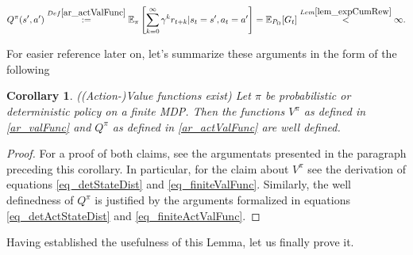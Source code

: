 \documentclass[11pt]{article} %
\newtheorem{cor}{Corollary}
\begin{document}
\begin{equation}\label{eq_finiteActValFunc}
	Q^{\pi}(s',a') \overset{Def \ref{ar_actValFunc}}{:= }\mathbb{E}_{\pi}\left[\sum_{k=0}^{\infty} \gamma^k r_{t+k} | s_t = s', a_t = a'\right] = \mathbb{E}_{P_\Omega}[G_t] \overset{Lem \ref{lem_expCumRew}}{<} \infty.
\end{equation}

For easier reference later on, let's summarize these arguments in the form of the following 

\begin{cor}{((Action-)Value functions exist)}
	Let $\pi$ be probabilistic or deterministic policy on a finite MDP. Then the functions $V^{\pi}$ as defined in \ref{ar_valFunc} and $Q^{\pi}$ as defined in \ref{ar_actValFunc} are well defined.
\end{cor}

\begin{proof}
	For a proof of both claims, see the argumentats presented in the paragraph preceding this corollary. In particular, for the claim about $V^{\pi}$ see the derivation of equations \ref{eq_detStateDist} and \ref{eq_finiteValFunc}. Similarly, the well definedness of $Q^{\pi}$ is justified by the arguments formalized in equations \ref{eq_detActStateDist} and \ref{eq_finiteActValFunc}.
\end{proof}

Having established the usefulness of this Lemma, let us finally prove it.
\end{document}
